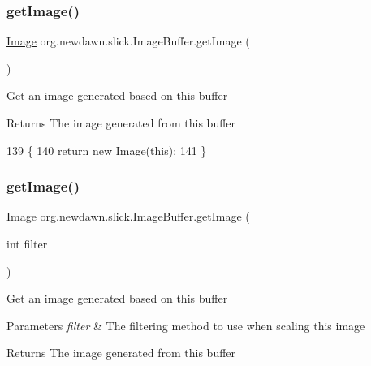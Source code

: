 \subsubsection{\texorpdfstring{get\+Image()}{getImage()}\hspace{0.1cm}{\footnotesize\ttfamily [1/2]}}
{\footnotesize\ttfamily \mbox{\hyperlink{classorg_1_1newdawn_1_1slick_1_1_image}{Image}} org.\+newdawn.\+slick.\+Image\+Buffer.\+get\+Image (\begin{DoxyParamCaption}{ }\end{DoxyParamCaption})\hspace{0.3cm}{\ttfamily [inline]}}

Get an image generated based on this buffer

\begin{DoxyReturn}{Returns}
The image generated from this buffer 
\end{DoxyReturn}

\begin{DoxyCode}
139                             \{
140         \textcolor{keywordflow}{return} \textcolor{keyword}{new} Image(\textcolor{keyword}{this});
141     \}
\end{DoxyCode}
\mbox{\label{classorg_1_1newdawn_1_1slick_1_1_image_buffer_a8d6a39b67e7629abb8882c1bfbccf3d3}} 
\subsubsection{\texorpdfstring{get\+Image()}{getImage()}\hspace{0.1cm}{\footnotesize\ttfamily [2/2]}}
{\footnotesize\ttfamily \mbox{\hyperlink{classorg_1_1newdawn_1_1slick_1_1_image}{Image}} org.\+newdawn.\+slick.\+Image\+Buffer.\+get\+Image (\begin{DoxyParamCaption}\item[{int}]{filter }\end{DoxyParamCaption})\hspace{0.3cm}{\ttfamily [inline]}}

Get an image generated based on this buffer


\begin{DoxyParams}{Parameters}
{\em filter} & The filtering method to use when scaling this image \\
\hline
\end{DoxyParams}
\begin{DoxyReturn}{Returns}
The image generated from this buffer 
\end{DoxyReturn}


